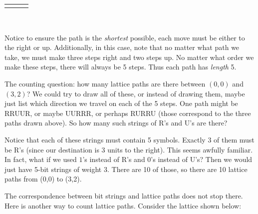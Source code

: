 \documentclass[10pt,]{book}
\theoremstyle{plain}
\theoremstyle{definition}
\theoremstyle{definition}
\theoremstyle{definition}
\theoremstyle{definition}
\numberwithin{equation}{chapter}
\newlength{\panelmax}
\begin{document}
{\leavevmode%
\setlength{\tabcolsep}{0.0166666666666667\linewidth}
\par\medskip\noindent
\hspace*{0.0166666666666667\linewidth}%
\begin{tabular}{@{}*{3}{c}@{}}
\begin{minipage}[c][\panelmax][t]{0.3\linewidth}\usebox{\panelboxAimage}\end{minipage}&
\begin{minipage}[c][\panelmax][t]{0.3\linewidth}\usebox{\panelboxBimage}\end{minipage}&
\begin{minipage}[c][\panelmax][t]{0.3\linewidth}\usebox{\panelboxCimage}\end{minipage}\end{tabular}\\
}%
\par
\hypertarget{p-810}{}%
Notice to ensure the path is the \emph{shortest} possible, each move must be either to the right or up. Additionally, in this case, note that no matter what path we take, we must make three steps right and two steps up. No matter what order we make these steps, there will always be 5 steps. Thus each path has \emph{length} 5.%
\par
\hypertarget{p-811}{}%
The counting question: how many lattice paths are there between \((0,0)\) and \((3,2)\)? We could try to draw all of these, or instead of drawing them, maybe just list which direction we travel on each of the 5 steps. One path might be RRUUR, or maybe UURRR, or perhaps RURRU (those correspond to the three paths drawn above). So how many such strings of R's and U's are there?%
\par
\hypertarget{p-812}{}%
Notice that each of these strings must contain 5 symbols. Exactly 3 of them must be R's (since our destination is 3 units to the right). This seems awfully familiar. In fact, what if we used \(1\)'s instead of R's and 0's instead of U's? Then we would just have 5-bit strings of weight 3. There are 10 of those, so there are 10 lattice paths from (0,0) to (3,2).%
\par
\hypertarget{p-813}{}%
The correspondence between bit strings and lattice paths does not stop there. Here is another way to count lattice paths. Consider the lattice shown below:%
\end{document}
